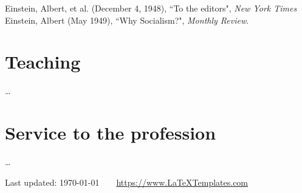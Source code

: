 \documentclass[11pt]{article} %
\begin{document}
Einstein, Albert, et al. (December 4, 1948), “To the editors", \emph{New York Times}\\
Einstein, Albert (May 1949), “Why Socialism?", \emph{Monthly Review}.


\section*{Teaching}

\ldots


\section*{Service to the profession}

\ldots

\vfill %


\begin{center}
	\scriptsize
	Last updated: \today~~\raisebox{-0.5pt}{\textbullet}~~\href{https://www.LaTeXTemplates.com}{https://www.LaTeXTemplates.com}
\end{center}

\end{document}
